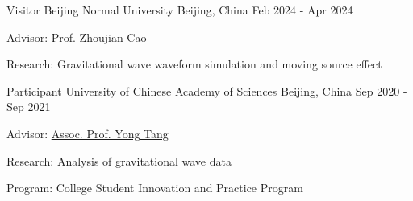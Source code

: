 

\begin{cventries}

  \cventry
    {Visitor} %
    {Beijing Normal University} %
    {Beijing, China} %
    {Feb 2024 - Apr 2024} %
    {
      \begin{cvitems} %
        \item{Advisor: \href{https://inspirehep.net/authors/1060083?ui-citation-summary=true&ui-exclude-self-citations=true}{Prof. Zhoujian Cao}}
        \item{Research: Gravitational wave waveform simulation and moving source effect}
      \end{cvitems}
    }

  \cventry
    {Participant} %
    {University of Chinese Academy of Sciences} %
    {Beijing, China} %
    {Sep 2020 - Sep 2021} %
    {
      \begin{cvitems} %
        \item{Advisor: \href{https://inspirehep.net/authors/1040919?ui-citation-summary=true&ui-exclude-self-citations=true}{Assoc. Prof. Yong Tang}}
        \item{Research: Analysis of gravitational wave data}
        \item{Program: College Student Innovation and Practice Program}
      \end{cvitems}
    }

\end{cventries}
